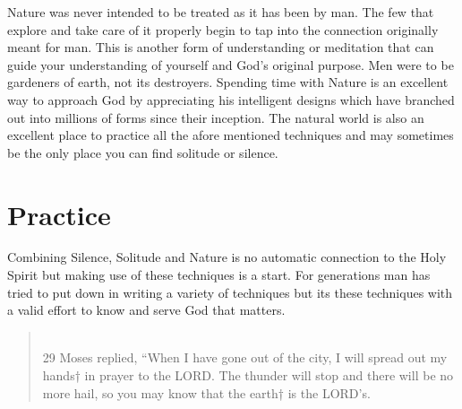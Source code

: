 \documentclass[11pt,a4paper]{scrartcl} %
\begin{document}
\begin{doublespace}
Nature was never intended to be treated as it has been by man. The few that explore and take care of it properly begin to tap into the connection originally meant for man. This is another form of understanding or meditation that can guide your understanding of yourself and God's original purpose. Men were to be gardeners of earth, not its destroyers. Spending time with Nature is an excellent way to approach God by appreciating his intelligent designs which have branched out into millions of forms since their inception. The natural world is also an excellent place to practice all the afore mentioned techniques and may sometimes be the only place you can find solitude or silence. 
\section{Practice}
Combining Silence, Solitude and Nature is no automatic connection to the Holy Spirit but making use of these techniques is a start. For generations man has tried to put down in writing a variety of techniques but its these techniques with a valid effort to know and serve God that matters.
\begin{verse}
\textcolor{Maroon}{}\\
29 Moses replied, “When I have gone out of the city, I will spread out my hands† in prayer to the LORD. The thunder will stop and there will be no more hail, so you may know that the earth† is the LORD’s. 
\end{verse} 
\end{doublespace}
\clearpage
    \nocite{*}
    
    
\end{document}
